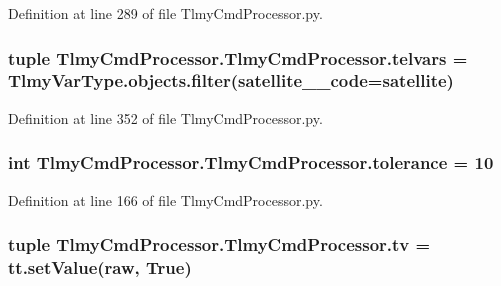 Definition at line 289 of file Tlmy\+Cmd\+Processor.\+py.

\hypertarget{namespace_tlmy_cmd_processor_1_1_tlmy_cmd_processor_a9d8c45d2e203eaa7eb7be5ece0116d39}{}
\subsubsection[{telvars}]{\setlength{\rightskip}{0pt plus 5cm}tuple Tlmy\+Cmd\+Processor.\+Tlmy\+Cmd\+Processor.\+telvars = Tlmy\+Var\+Type.\+objects.\+filter(satellite\+\_\+\+\_\+code={\bf satellite})}\label{namespace_tlmy_cmd_processor_1_1_tlmy_cmd_processor_a9d8c45d2e203eaa7eb7be5ece0116d39}


Definition at line 352 of file Tlmy\+Cmd\+Processor.\+py.

\hypertarget{namespace_tlmy_cmd_processor_1_1_tlmy_cmd_processor_afb50f24734d74f88dacebcac995fd9f4}{}
\subsubsection[{tolerance}]{\setlength{\rightskip}{0pt plus 5cm}int Tlmy\+Cmd\+Processor.\+Tlmy\+Cmd\+Processor.\+tolerance = 10}\label{namespace_tlmy_cmd_processor_1_1_tlmy_cmd_processor_afb50f24734d74f88dacebcac995fd9f4}


Definition at line 166 of file Tlmy\+Cmd\+Processor.\+py.

\hypertarget{namespace_tlmy_cmd_processor_1_1_tlmy_cmd_processor_a36635165909c763c93ffdab98dd13ec3}{}
\subsubsection[{tv}]{\setlength{\rightskip}{0pt plus 5cm}tuple Tlmy\+Cmd\+Processor.\+Tlmy\+Cmd\+Processor.\+tv = tt.\+set\+Value({\bf raw}, True)}\label{namespace_tlmy_cmd_processor_1_1_tlmy_cmd_processor_a36635165909c763c93ffdab98dd13ec3}


